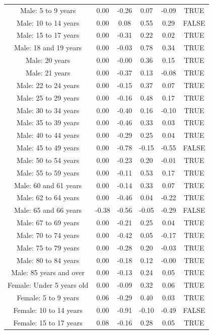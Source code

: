 \documentclass{article} %
\begin{document}
\begin{table}[H]
\begin{adjustbox}{width = \textwidth}
\begin{tabular}{cccccc}
  Male: 5 to 9 years & 0.00 & -0.26 & 0.07 & -0.09 & TRUE \\ 
  Male: 10 to 14 years & 0.00 & 0.08 & 0.55 & 0.29 & FALSE \\ 
  Male: 15 to 17 years & 0.00 & -0.31 & 0.22 & 0.02 & TRUE \\ 
  Male: 18 and 19 years & 0.00 & -0.03 & 0.78 & 0.34 & TRUE \\ 
  Male: 20 years & 0.00 & -0.00 & 0.36 & 0.15 & TRUE \\ 
  Male: 21 years & 0.00 & -0.37 & 0.13 & -0.08 & TRUE \\ 
  Male: 22 to 24 years & 0.00 & -0.15 & 0.37 & 0.07 & TRUE \\ 
  Male: 25 to 29 years & 0.00 & -0.16 & 0.48 & 0.17 & TRUE \\ 
  Male: 30 to 34 years & 0.00 & -0.40 & 0.16 & -0.10 & TRUE \\ 
  Male: 35 to 39 years & 0.00 & -0.46 & 0.33 & 0.03 & TRUE \\ 
  Male: 40 to 44 years & 0.00 & -0.29 & 0.25 & 0.04 & TRUE \\ 
  Male: 45 to 49 years & 0.00 & -0.78 & -0.15 & -0.55 & FALSE \\ 
  Male: 50 to 54 years & 0.00 & -0.23 & 0.20 & -0.01 & TRUE \\ 
  Male: 55 to 59 years & 0.00 & -0.11 & 0.53 & 0.17 & TRUE \\ 
  Male: 60 and 61 years & 0.00 & -0.14 & 0.33 & 0.07 & TRUE \\ 
  Male: 62 to 64 years & 0.00 & -0.46 & 0.04 & -0.22 & TRUE \\ 
  Male: 65 and 66 years & -0.38 & -0.56 & -0.05 & -0.29 & FALSE \\ 
  Male: 67 to 69 years & 0.00 & -0.21 & 0.25 & 0.04 & TRUE \\ 
  Male: 70 to 74 years & 0.00 & -0.42 & 0.05 & -0.17 & TRUE \\ 
  Male: 75 to 79 years & 0.00 & -0.28 & 0.20 & -0.03 & TRUE \\ 
  Male: 80 to 84 years & 0.00 & -0.18 & 0.12 & -0.00 & TRUE \\ 
  Male: 85 years and over & 0.00 & -0.13 & 0.24 & 0.05 & TRUE \\ 
  Female: Under 5 years old & 0.00 & -0.09 & 0.32 & 0.06 & TRUE \\ 
  Female: 5 to 9 years & 0.06 & -0.29 & 0.40 & 0.03 & TRUE \\ 
  Female: 10 to 14 years & 0.00 & -0.91 & -0.10 & -0.49 & FALSE \\ 
  Female: 15 to 17 years & 0.08 & -0.16 & 0.28 & 0.05 & TRUE \\ 

\end{tabular}
\end{adjustbox}
\end{table}
\end{document}
